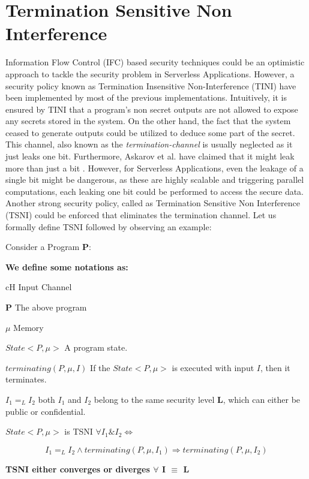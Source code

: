 \section{Termination Sensitive Non Interference}
\label{section:TSNI}
Information Flow Control (IFC) \cite{Denning1976, Hedin2011} based security techniques could be an optimistic approach to tackle the security problem in Serverless Applications. However, a security policy known as Termination Insensitive Non-Interference (TINI) have been implemented by most of the previous implementations. Intuitively, it is ensured by TINI that a program's non secret outputs are not allowed to expose any secrets stored in the system. On the other hand, the fact that the system ceased to generate outputs could be utilized to deduce some part of the secret. This channel, also known as the \textit{termination-channel} is usually neglected as it just leaks one bit. Furthermore, Askarov et al. have claimed that it might leak more than just a bit \cite{Askarov2008}. However, for Serverless Applications, even the leakage of a single bit might be dangerous, as these are highly scalable and triggering parallel computations, each leaking one bit could be performed to access the secure data. Another strong security policy, called as Termination Sensitive Non Interference (TSNI) \cite{Sabelfeld2001} could be enforced that eliminates the termination channel. Let us formally define TSNI followed by observing an example:\par
\medskip
	\begin{mdframed}[linewidth = 0.05cm, backgroundcolor=blue!20, nobreak=true]
		\noindent Consider a Program \textbf{P}:
		\begin{framed}
			
		\end{framed}
		\noindent \textbf{We define some notations as:}\par
		{cH} \tab Input Channel \par \medskip
		\textbf{P} \tab The above program \par \medskip
		$\mu$ \tab Memory \par \medskip
		$State<P,\mu>$ \tab A program state. \par \medskip
		$terminating(P, \mu, I)$ \tab If the $State<P,\mu>$ is executed with input $I$, \tab \tab \tab then it terminates. \par \medskip
		$I_{1} = _{L} I_{2}$ \tab both $I_{1}$ and $I_{2}$ belong to the same security \tab \tab \tab level \textbf{L}, which can either be public or \tab \tab \tab confidential. \par \medskip
		\noindent $State<P,\mu>$ is TSNI  $\forall I_{1} \& I_{2} \iff$
		\begin{framed}
			\begin{equation} \label{eq:TSNI}
			I_{1} = _{L} I_{2} \land terminating(P, \mu, I_{1}) \Longrightarrow terminating(P, \mu, I_{2})
			\end{equation}
		\end{framed}
		\noindent \textbf{TSNI either converges or diverges $\forall$ I $\equiv$ L}
	\end{mdframed}
